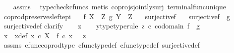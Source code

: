 \begin{isabellebody}
%
\isadelimproof
\ \ %
\endisadelimproof
%
\isatagproof
{}\isamarkupfalse%
\ assms\ \isamarkupfalse%
\ {\isacharparenleft}{\kern0pt}typecheck{\isacharunderscore}{\kern0pt}cfuncs{\isacharcomma}{\kern0pt}\ metis\ coprojs{\isacharunderscore}{\kern0pt}jointly{\isacharunderscore}{\kern0pt}surj\ terminal{\isacharunderscore}{\kern0pt}func{\isacharunderscore}{\kern0pt}unique{\isacharparenright}{\kern0pt}%
\endisatagproof
{\isafoldproof}%
%
\isadelimproof
\isanewline
%
\endisadelimproof
\isanewline
{}\isamarkupfalse%
\ coprod{\isacharunderscore}{\kern0pt}preserves{\isacharunderscore}{\kern0pt}left{\isacharunderscore}{\kern0pt}epi{\isacharcolon}{\kern0pt}\isanewline
\ \ \ {\isachardoublequoteopen}f{\isacharcolon}{\kern0pt}\ X\ {\isasymrightarrow}\ Z{\isachardoublequoteclose}\ {\isachardoublequoteopen}g{\isacharcolon}{\kern0pt}\ Y\ {\isasymrightarrow}\ Z{\isachardoublequoteclose}\isanewline
\ \ \ {\isachardoublequoteopen}surjective{\isacharparenleft}{\kern0pt}f{\isacharparenright}{\kern0pt}{\isachardoublequoteclose}\isanewline
\ \ \ {\isachardoublequoteopen}surjective{\isacharparenleft}{\kern0pt}f\ {\isasymamalg}\ g{\isacharparenright}{\kern0pt}{\isachardoublequoteclose}\isanewline
%
\isadelimproof
\ \ %
\endisadelimproof
%
\isatagproof
{}\isamarkupfalse%
\ surjective{\isacharunderscore}{\kern0pt}def\isanewline
{}\isamarkupfalse%
{\isacharparenleft}{\kern0pt}clarify{\isacharparenright}{\kern0pt}\isanewline
\ \ \isamarkupfalse%
\ z\isanewline
\ \ \isamarkupfalse%
\ y{\isacharunderscore}{\kern0pt}type{\isacharbrackleft}{\kern0pt}type{\isacharunderscore}{\kern0pt}rule{\isacharbrackright}{\kern0pt}{\isacharcolon}{\kern0pt}\ {\isachardoublequoteopen}z\ {\isasymin}\isactrlsub c\ codomain\ {\isacharparenleft}{\kern0pt}f\ {\isasymamalg}\ g{\isacharparenright}{\kern0pt}{\isachardoublequoteclose}\isanewline
\ \ \isamarkupfalse%
\ \isamarkupfalse%
\ x\ \ x{\isacharunderscore}{\kern0pt}def{\isacharcolon}{\kern0pt}\ {\isachardoublequoteopen}x\ {\isasymin}\isactrlsub c\ X\ {\isasymand}\ f\ {\isasymcirc}\isactrlsub c\ x\ \ {\isacharequal}{\kern0pt}\ z{\isachardoublequoteclose}\isanewline
\ \ \ \ \isamarkupfalse%
\ assms\ cfunc{\isacharunderscore}{\kern0pt}coprod{\isacharunderscore}{\kern0pt}type\ cfunc{\isacharunderscore}{\kern0pt}type{\isacharunderscore}{\kern0pt}def\ cfunc{\isacharunderscore}{\kern0pt}type{\isacharunderscore}{\kern0pt}def\ surjective{\isacharunderscore}{\kern0pt}def\ \isamarkupfalse%

\end{isabellebody}
